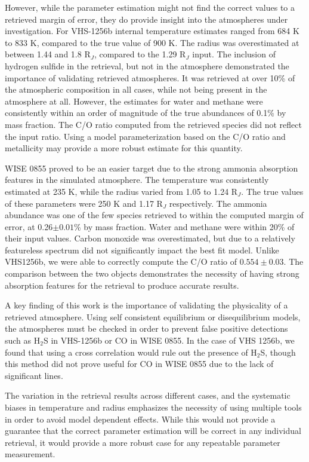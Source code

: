 However, while the parameter estimation might not find the correct values to a retrieved margin of error, they do provide insight into the atmospheres under investigation.
For VHS-1256b internal temperature estimates ranged from 684 K to 833 K, compared to the true value of 900 K. 
The radius was overestimated at between 1.44 and 1.8 R$_{J}$, compared to the 1.29 R$_{J}$ input.
The inclusion of hydrogen sulfide in the retrieval, but not in the atmosphere demonstrated the importance of validating retrieved atmospheres. 
It was retrieved at over 10\% of the atmospheric composition in all cases, while not being present in the atmosphere at all.
However, the estimates for water and methane were consistently within an order of magnitude of the true abundances of 0.1\% by mass fraction.
The C/O ratio computed from the retrieved species did not reflect the input ratio.
Using a model parameterization based on the C/O ratio and metallicity may provide a more robust estimate for this quantity.

WISE 0855 proved to be an easier target due to the strong ammonia absorption features in the simulated atmosphere.
The temperature was consistently estimated at 235 K, while the radius varied from 1.05 to 1.24 R$_{J}$.
The true values of these parameters were 250 K and 1.17 R$_{J}$ respectively.
The ammonia abundance was one of the few species retrieved to within the computed margin of error, at 0.26$\pm0.01$\% by mass fraction.
Water and methane were within 20\% of their input values.
Carbon monoxide was overestimated, but due to a relatively featureless spectrum did not significantly impact the best fit model.
Unlike VHS1256b, we were able to correctly compute the C/O ratio of $0.554\pm0.03$.
The comparison between the two objects demonstrates the necessity of having strong absorption features for the retrieval to produce accurate results.

A key finding of this work is the importance of validating the physicality of a retrieved atmosphere.
Using self consistent equilibrium or disequilibrium models, the atmospheres must be checked in order to prevent false positive detections such as H$_{2}$S in VHS-1256b or CO in WISE 0855.
In the case of VHS 1256b, we found that using a cross correlation would rule out the presence of H$_{2}$S, though this method did not prove useful for CO in WISE 0855 due to the lack of significant lines.

The variation in the retrieval results across different cases, and the systematic biases in temperature and radius emphasizes the necessity of using multiple tools in order to avoid model dependent effects.
While this would not provide a guarantee that the correct parameter estimation will be correct in any individual retrieval, it would provide a more robust case for any repeatable parameter measurement. 
